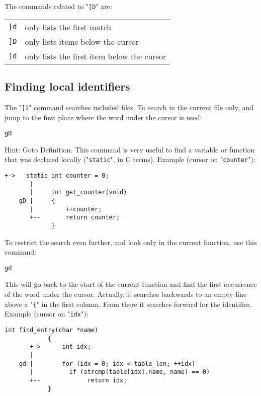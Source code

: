 The commands related to "\texttt{[D}" are:

\begin{center} \begin{tabular}{c l}
\texttt{[d} & only lists the first match \\
\texttt{]D} & only lists items below the cursor \\
\texttt{]d} & only lists the first item below the cursor \\
\end{tabular} \end{center}
\subsection{Finding local identifiers}
The "\texttt{[I}" command searches included files.
To search in the current file only, and jump to the first place where the word under the cursor is used:

\begin{Verbatim}[samepage=true]
 gD
\end{Verbatim}

Hint: Goto Definition.
This command is very useful to find a variable or function that was declared locally ("\texttt{static}", in C terms).
Example (cursor on "\texttt{counter}"):

\begin{Verbatim}[samepage=true]
       +->   static int counter = 0;
       |
       |     int get_counter(void)
    gD |     {
       |         ++counter;
       +--       return counter;
             }
\end{Verbatim}

To restrict the search even further, and look only in the current function, use this command:

\begin{Verbatim}[samepage=true]
 gd
\end{Verbatim}

This will go back to the start of the current function and find the first occurrence of the word under the cursor.
Actually, it searches backwards to an empty line above a "\texttt{\{}" in the first column.
From there it searches forward for the identifier.
Example (cursor on "\texttt{idx}"):

\begin{Verbatim}[samepage=true]
            int find_entry(char *name)
            {
       +->      int idx;
       |
    gd |        for (idx = 0; idx < table_len; ++idx)
       |          if (strcmp(table[idx].name, name) == 0)
       +--             return idx;
            }
\end{Verbatim}
\clearpage
